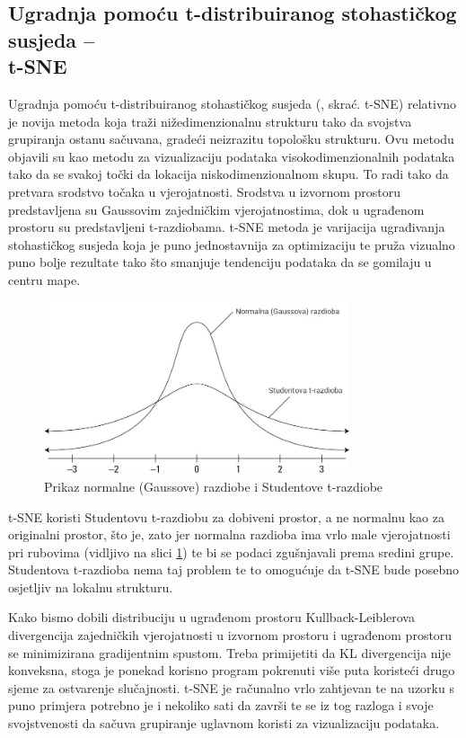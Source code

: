 \documentclass[times, utf8, diplomski]{fer}
\begin{document}
\subsection{Ugradnja pomoću t-distribuiranog stohastičkog susjeda --\\ t-SNE}
Ugradnja pomoću t-distribuiranog stohastičkog susjeda (, skrać. t-SNE) relativno je novija metoda koja traži nižedimenzionalnu strukturu tako da svojstva grupiranja ostanu sačuvana, gradeći neizrazitu  topološku strukturu. Ovu metodu objavili su \cite{maaten2008visualizing} kao metodu za vizualizaciju podataka visokodimenzionalnih podataka tako da se svakoj točki da lokacija niskodimenzionalnom skupu. To radi tako da pretvara srodstvo točaka u vjerojatnosti. Srodstva u izvornom prostoru predstavljena su Gaussovim zajedničkim vjerojatnostima, dok u ugrađenom prostoru su predstavljeni t-razdiobama. t-SNE metoda je varijacija ugrađivanja stohastičkog susjeda  koja je puno jednostavnija za optimizaciju te pruža vizualno puno bolje rezultate tako što smanjuje tendenciju podataka da se gomilaju u centru mape.
\begin{figure}[htb]
    \centering
    \includegraphics[width=9cm]{resources/images/reduction/tsne.jpg}
    \caption{Prikaz normalne (Gaussove) razdiobe i Studentove t-razdiobe}
    \label{fig:tsne}
\end{figure}

t-SNE koristi Studentovu t-razdiobu za dobiveni prostor, a ne normalnu kao za originalni prostor, što je, zato jer normalna razdioba ima vrlo male vjerojatnosti pri rubovima (vidljivo na slici \ref{fig:tsne}) te bi se podaci zgušnjavali prema sredini grupe. Studentova t-razdioba nema taj problem te to omogućuje da t-SNE bude posebno osjetljiv na lokalnu strukturu.

Kako bismo dobili distribuciju u ugrađenom prostoru Kullback-Leiblerova divergencija zajedničkih vjerojatnosti u izvornom prostoru i ugrađenom prostoru se minimizirana gradijentnim spustom. Treba primijetiti da KL divergencija nije konveksna, stoga je ponekad korisno program pokrenuti više puta koristeći drugo sjeme za ostvarenje slučajnosti. t-SNE je računalno vrlo zahtjevan te na uzorku s puno primjera potrebno je i nekoliko sati da završi te se iz tog razloga i svoje svojstvenosti da sačuva grupiranje uglavnom koristi za vizualizaciju podataka.
\end{document}
